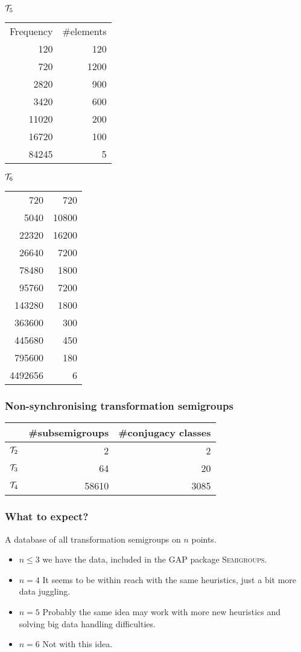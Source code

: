 \documentclass{beamer}
\newcommand{\cT}{{\cal T}}
\newcommand{\jump}{\vskip6pt}
\begin{document}
\begin{frame}
$\cT_5$
\begin{tabular}{r|r}
Frequency & \#elements\\
120 & 120\\
720 & 1200\\
2820 & 900\\
3420 & 600\\
11020 & 200\\
16720 & 100\\
84245 & 5\\
\end{tabular}
\jump
$\cT_6$
\begin{tabular}{r|r}
\hline
720 & 720\\
5040 & 10800\\
22320 & 16200\\
26640 & 7200\\
78480 & 1800\\
95760 & 7200\\
143280 & 1800\\
363600 & 300\\
445680 & 450\\
795600 & 180\\
4492656 & 6\\
\end{tabular}


\end{frame}

\begin{frame}
\frametitle{Non-synchronising transformation semigroups}
\begin{tabular}{c|r|r}
& \#subsemigroups & \#conjugacy classes\\
\hline
$\cT_2$ & 2 & 2\\
$\cT_3$ & 64 & 20\\
$\cT_4$ & 58610 & 3085
\end{tabular}
\end{frame}

\begin{frame}\frametitle{What to expect?}
A database of all transformation semigroups on $n$ points.
\begin{itemize}
\item $n\leq 3$ we have the data, included in the \textsc{GAP} package \textsc{Semigroups}.
\item $n=4$ It seems to be within reach with the same heuristics, just a bit more data juggling.
\item $n=5$ Probably the same idea may work with more new heuristics and solving big data handling difficulties.
\item $n=6$ Not with this idea.
\end{itemize}
\end{frame}
\end{document}
